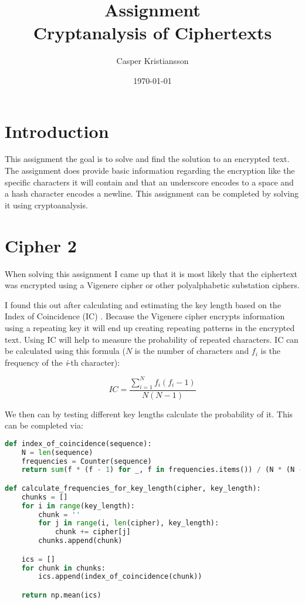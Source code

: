 \documentclass{article}
\title{Assignment \\ Cryptanalysis of Ciphertexts}
\author{Casper Kristiansson}
\date{\today}
\begin{document}
\maketitle

\section{Introduction}
This assignment the goal is to solve and find the solution to an encrypted text. The assignment does provide basic information regarding the encryption like the specific characters it will contain and that an underscore encodes to a space and a hash character encodes a newline. This assignment can be completed by solving it using cryptoanalysis.

\section{Cipher 2}
When solving this assignment I came up that it is most likely that the ciphertext was encrypted using a Vigenere cipher or other polyalphabetic substation ciphers.

I found this out after calculating and estimating the key length based on the Index of Coincidence (IC) \cite{christensen2015cryptanalysis}. Because the Vigenere cipher encrypts information using a repeating key it will end up creating repeating patterns in the encrypted text. Using IC will help to measure the probability of repeated characters. IC can be calculated using this formula (\(N\) is the number of characters and \(f_i\) is the frequency of the \textit{i}-th character):

\[IC = \frac{\sum_{i=1}^{N} f_i (f_i - 1)}{N (N - 1)}\]

We then can by testing different key lengths calculate the probability of it. This can be completed via:

\begin{lstlisting}[language=Python]
def index_of_coincidence(sequence):
    N = len(sequence)
    frequencies = Counter(sequence)
    return sum(f * (f - 1) for _, f in frequencies.items()) / (N * (N - 1))

def calculate_frequencies_for_key_length(cipher, key_length):
    chunks = []
    for i in range(key_length):
        chunk = ''
        for j in range(i, len(cipher), key_length):
            chunk += cipher[j]
        chunks.append(chunk)

    ics = []
    for chunk in chunks:
        ics.append(index_of_coincidence(chunk))

    return np.mean(ics)
\end{lstlisting}
\end{document}
